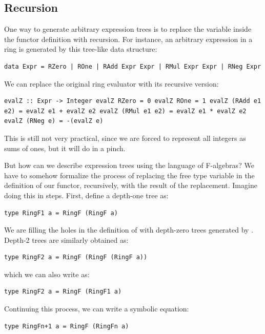 \subsection{Recursion}\label{recursion}

One way to generate arbitrary expression trees is to replace the
variable  inside the functor definition with recursion. For
instance, an arbitrary expression in a ring is generated by this
tree-like data structure:

\begin{verbatim}
data Expr = RZero | ROne | RAdd Expr Expr | RMul Expr Expr | RNeg Expr
\end{verbatim}

We can replace the original ring evaluator with its recursive version:

\begin{verbatim}
evalZ :: Expr -> Integer evalZ RZero = 0 evalZ ROne = 1 evalZ (RAdd e1 e2) = evalZ e1 + evalZ e2 evalZ (RMul e1 e2) = evalZ e1 * evalZ e2 evalZ (RNeg e) = -(evalZ e)
\end{verbatim}

This is still not very practical, since we are forced to represent all
integers as sums of ones, but it will do in a pinch.

But how can we describe expression trees using the language of
F-algebras? We have to somehow formalize the process of replacing the
free type variable in the definition of our functor, recursively, with
the result of the replacement. Imagine doing this in steps. First,
define a depth-one tree as:

\begin{verbatim}
type RingF1 a = RingF (RingF a)
\end{verbatim}

We are filling the holes in the definition of  with
depth-zero trees generated by . Depth-2 trees are
similarly obtained as:

\begin{verbatim}
type RingF2 a = RingF (RingF (RingF a))
\end{verbatim}

which we can also write as:

\begin{verbatim}
type RingF2 a = RingF (RingF1 a)
\end{verbatim}

Continuing this process, we can write a symbolic equation:

\begin{verbatim}
type RingFn+1 a = RingF (RingFn a)
\end{verbatim}

